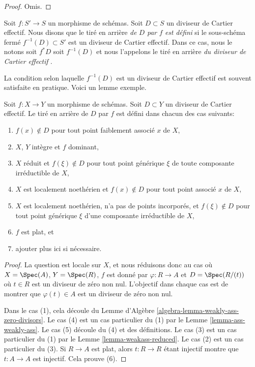 \begin{proof}
Omis.
\end{proof}

\begin{definition}
\label{definition-pullback-effective-Cartier-divisor}
Soit  $f : S' \to S$  un morphisme de schémas. Soit  $D \subset S$  un diviseur de
Cartier effectif. Nous disons que le tiré en arrière  {\it  de
 $D$  par  $f$  est défini }  si le sous-schéma fermé
 $f^{-1}(D) \subset S'$  est un diviseur de Cartier effectif. Dans ce cas, nous le notons soit
 $f^*D$  soit  $f^{-1}(D)$  et nous l'appelons le tiré en arrière
 {\it  du diviseur de Cartier effectif }.
\end{definition}

\noindent
La condition selon laquelle  $f^{-1}(D)$  est un diviseur de Cartier effectif est
souvent satisfaite en pratique. Voici un lemme exemple.

\begin{lemma}
\label{lemma-pullback-effective-Cartier-defined}
Soit  $f : X \to Y$  un morphisme de schémas. Soit  $D \subset Y$  un diviseur de
Cartier effectif. Le tiré en arrière de  $D$  par  $f$  est défini
dans chacun des cas suivants:
\begin{enumerate}
\item $f(x) \not \in D$  pour tout point faiblement associé  $x$  de  $X$,
\item $X$,  $Y$  intègre et  $f$  dominant,
\item $X$  réduit et  $f(\xi) \not \in D$  pour tout point générique  $\xi$  de
toute composante irréductible de  $X$,
\item $X$  est localement noethérien et  $f(x) \not \in D$  pour tout point associé
 $x$  de  $X$,
\item $X$  est localement noethérien, n'a pas de points incorporés, et
 $f(\xi) \not \in D$  pour tout point générique  $\xi$  d'une composante irréductible
de  $X$,
\item $f$  est plat, et
\item ajouter plus ici si nécessaire.
\end{enumerate}
\end{lemma}

\begin{proof}
La question est locale sur  $X$, et nous réduisons donc au cas où
 $X = \Spec(A)$,  $Y = \Spec(R)$,  $f$  est donné par  $\varphi : R \to A$  et
 $D = \Spec(R/(t))$  où  $t \in R$  est un diviseur de zéro non nul. L'objectif dans
chaque cas est de montrer que  $\varphi(t) \in A$  est un diviseur de zéro non nul.

\medskip\noindent
Dans le cas (1), cela découle du Lemme d'Algèbre  \ref{algebra-lemma-weakly-ass-zero-divisors}. Le cas (4) est un
cas particulier du (1) par le Lemme  \ref{lemma-ass-weakly-ass}. Le cas (5) découle du (4) et des
définitions. Le cas (3) est un cas particulier du (1) par le Lemme  \ref{lemma-weakass-reduced}.
Le cas (2) est un cas particulier du (3). Si  $R \to A$  est plat, alors
 $t : R \to R$  étant injectif montre que  $t : A \to A$  est injectif. Cela prouve (6).
\end{proof}

